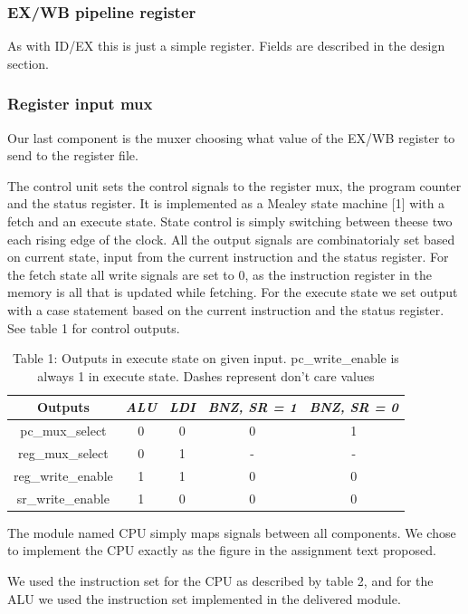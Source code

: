 \documentclass[11pt]{report}
\begin{document}
\subsubsection*{EX/WB pipeline register}
As with ID/EX this is just a simple register. Fields are described in the design section.
\subsubsection*{Register input mux}
Our last component is the muxer choosing what value of the EX/WB register to send to the
register file. 


The control unit sets the control signals to the register mux, the program counter 
and the status register. It is implemented as a Mealey state machine [1]
with a fetch and an execute state. State control is simply switching between theese two
each rising edge of the clock. All the output signals are combinatorialy set based on current
state, input from the current instruction and the status register. For the fetch state all
write signals are set to 0, as the instruction register in the memory is all that is updated
while fetching. For the execute state we set output with a case statement based on the current 
instruction and the status register. See table 1 for control outputs.

\begin{table}[h]
  \centering
  \begin{tabular}{|c|c|c|c|c|} \hline
    Outputs&\emph{ALU}&\emph{LDI}&\emph{BNZ, SR = 1}&\emph{BNZ, SR = 0}\\ \hline
    pc\_mux\_select&0&0&0&1  \\
    reg\_mux\_select&0&1&-&-  \\
    reg\_write\_enable&1&1&0&0  \\
    sr\_write\_enable&1&0&0&0  \\
    \hline
  \end{tabular}
  \caption{Table 1: Outputs in execute state on given input.
  pc\_write\_enable is always 1 in execute state. Dashes represent don't care values}
\end{table}

The module named CPU simply maps signals between all components.  
We chose to implement the CPU exactly as the figure in the assignment text proposed.

We used the instruction set for the CPU as described by table 2, and for the ALU we
used the instruction set implemented in the delivered module.
\end{document}
